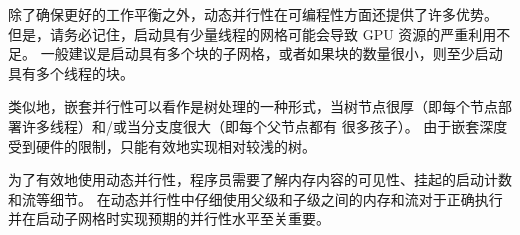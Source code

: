 除了确保更好的工作平衡之外，动态并行性在可编程性方面还提供了许多优势。 但是，请务必记住，启动具有少量线程的网格可能会导致 GPU 资源的严重利用不足。 一般建议是启动具有多个块的子网格，或者如果块的数量很小，则至少启动具有多个线程的块。

类似地，嵌套并行性可以看作是树处理的一种形式，当树节点很厚（即每个节点部署许多线程）和/或当分支度很大（即每个父节点都有 很多孩子）。 由于嵌套深度受到硬件的限制，只能有效地实现相对较浅的树。

为了有效地使用动态并行性，程序员需要了解内存内容的可见性、挂起的启动计数和流等细节。 在动态并行性中仔细使用父级和子级之间的内存和流对于正确执行并在启动子网格时实现预期的并行性水平至关重要。
